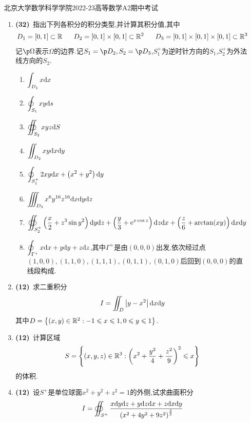 \documentclass{ctexart}
\begin{document}
\pagestyle{empty}
\begin{center}\Large
    北京大学数学科学学院2022-23高等数学A2期中考试
\end{center}
\begin{enumerate}[leftmargin=*,label=\textbf{\arabic*.}]
    \item \textbf{(32)}\ 指出下列各积分的积分类型,并计算其积分值,其中
    \[D_1=[0,1]\subset\R\ \ \ \ \ D_2=[0,1]\times[0,1]\subset\R^2\ \ \ \ \ D_3=[0,1]\times[0,1]\times[0,1]\subset\R^3\]
    记$\p\Omega$表示$\Omega$的边界.记$S_1=\p D_2,S_2=\p D_3$,$S_1^+$为逆时针方向的$S_1$,$S_2^+$为外法线方向的$S_2$.
    \begin{enumerate}[label=\tbf{(\arabic*)}]
        \item $\displaystyle\int_{D_1}x\mathrm{d} x$
        \item $\displaystyle\oint_{S_1}xy\mathrm{d} s$
        \item $\displaystyle\oiint_{S_2}xyz\mathrm{d} S$
        \item $\displaystyle\iint_{D_2}xy\mathrm{d} x\mathrm{d} y$
        \item $\displaystyle\oint_{S_1^+}2xy\mathrm{d} x+\left(x^2+y^2\right)\mathrm{d} y$
        \item $\displaystyle\iiint_{D_3}x^6y^{16}z^{16}\mathrm{d} x\mathrm{d} y\mathrm{d} z$
        \item $\displaystyle\oiint_{S_2^+}\left(\dfrac x2+z^3\sin y^2\right)\mathrm{d} y\mathrm{d} z+\left(\dfrac y3+\mathrm{e}^{x\cos z}\right)\mathrm{d} z\mathrm{d} x+\left(\dfrac z6+\arctan(xy)\right)\mathrm{d} x\mathrm{d} y$
        \item $\displaystyle\oint_{\Gamma^+}x\mathrm{d} x+y\mathrm{d} y+z\mathrm{d} z$,其中$\Gamma^+$是由$(0,0,0)$出发,依次经过点$(1,0,0),(1,1,0),(1,1,1),(0,1,1),(0,1,0)$后回到$(0,0,0)$的直线段构成.
    \end{enumerate}

    \item \textbf{(12)}\ 求二重积分
    \[I=\iint_{D}\left|y-x^2\right|\mathrm{d} x\mathrm{d} y\]
    其中$D=\left\{(x,y)\in\mathbb{R}^2:-1\leqslant x\leqslant1,0\leqslant y\leqslant1\right\}$.

    \item \textbf{(12)}\ 计算区域
    \[S=\left\{(x,y,z)\in\mathbb{R}^3:\left(x^2+\dfrac{y^2}{4}+\dfrac{z^2}{9}\right)^2\leqslant x\right\}\]
    的体积.

    \item \textbf{(12)}\ 设$S^+$是单位球面$x^2+y^2+z^2=1$的外侧,试求曲面积分
    \[I=\oiint_{S^+}\dfrac{x\mathrm{d} y\mathrm{d} z+y\mathrm{d} z\mathrm{d} x+z\mathrm{d} x\mathrm{d} y}{\left(x^2+4y^2+9z^2\right)^{\frac32}}\]


\end{enumerate}
\end{document}
